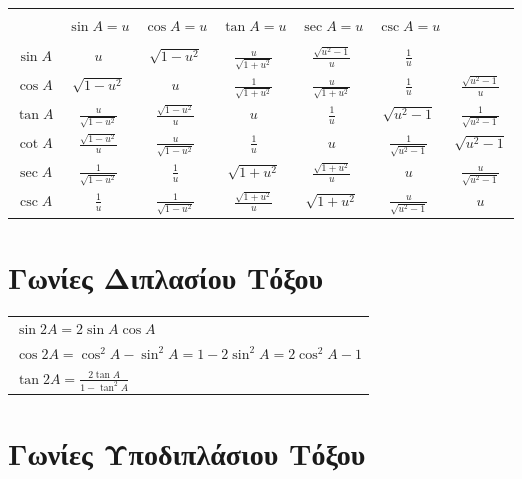 \begin{center}
    \begin{tabular}{*{7}c}
        \toprule \\
    & $ \sin{A} = u $ & $ \cos{A} = u $ & $ \tan{A} = u $ & $ \sec{A} = u $ & $
    \csc{A} = u $ \\
    \midrule \\
        $ \sin{A} $ & $ u $ & $ \sqrt{1-u^{2}} $ & $ \frac{u}{\sqrt{1 + u^{2}}
    }$ & $ \frac{\sqrt{u^{2}-1} }{u} $ & $ \frac{1}{u} $ \\ 
        $ \cos{A} $ & $ \sqrt{1-u^{2}} $ & $ u $ & $ \frac{1}{\sqrt{1 + u^{2}}}
        $ & $ \frac{u}{\sqrt{1 + u^{2}}} $ & $ \frac{1}{u} $ & $
        \frac{\sqrt{u^{2}-1}}{u} $ \\  
        $ \tan{A} $ & $ \frac{u}{ \sqrt{1-u^{2}}} $ & $ \frac{ \sqrt{1-u^{2}}}{
        u} $ & $ u $ & $ \frac{1}{u} $ & $ \sqrt{u^{2}-1} $ & $
        \frac{1}{\sqrt{u^{2}-1}} $ \\
        $ \cot{A} $ & $ \frac{ \sqrt{1-u^{2}}}{u} $ & $ \frac{u}{
    \sqrt{1-u^{2}}} $ & $ \frac{1}{u} $ & $ u $ & $ \frac{1}{\sqrt{u^{2}-1}} $ & $
    \sqrt{u^{2}-1} $ \\
        $ \sec{A} $ & $ \frac{1}{ \sqrt{1-u^{2}}} $ & $ \frac{1}{u} $ & 
        $\sqrt{1 + u^{2}} $ & $ \frac{\sqrt{1 + u^{2}}}{u} $ & $ u $ & 
            $ \frac{u}{\sqrt{u^{2}-1}} $ \\
        $ \csc{A} $ & $ \frac{1}{u} $ & $ \frac{1}{\sqrt{1-u^{2}}} $ &
        $ \frac{\sqrt{1 + u^{2}}}{u} $ & $\sqrt{1 + u^{2}}$ &
        $ \frac{u}{\sqrt{u^{2}-1}} $ & $ u $ \\
        \bottomrule
    \end{tabular}
\end{center}


\section {Γωνίες Διπλασίου Τόξου}

\begin{tabular}{l}
    $ \sin{2A} = 2 \sin{A} \cos{A} $ \\
    $ \cos{2A} = \cos^{2}{A} - \sin^{2}{A} = 1 - 2 \sin^{2}{A} = 2
    \cos^{2}{A} -1 $ \\
    $ \tan{2A} = \frac{2 \tan{A}}{1 - \tan^{2}{A}} $ 
\end{tabular}

\section{Γωνίες Υποδιπλάσιου Τόξου}


